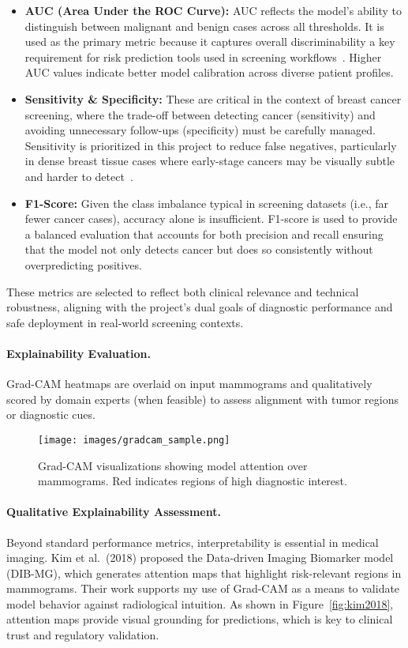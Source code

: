 \documentclass[12pt]{article}
\begin{document}
\begin{itemize}
    \item \textbf{AUC (Area Under the ROC Curve):} AUC reflects the model’s ability to distinguish between malignant and benign cases across all thresholds. It is used as the primary metric because it captures overall discriminability a key requirement for risk prediction tools used in screening workflows~\cite{1}. Higher AUC values indicate better model calibration across diverse patient profiles.

    \item \textbf{Sensitivity \& Specificity:} These are critical in the context of breast cancer screening, where the trade-off between detecting cancer (sensitivity) and avoiding unnecessary follow-ups (specificity) must be carefully managed. Sensitivity is prioritized in this project to reduce false negatives, particularly in dense breast tissue cases where early-stage cancers may be visually subtle and harder to detect~\cite{6}.

    \item \textbf{F1-Score:} Given the class imbalance typical in screening datasets (i.e., far fewer cancer cases), accuracy alone is insufficient. F1-score is used to provide a balanced evaluation that accounts for both precision and recall ensuring that the model not only detects cancer but does so consistently without overpredicting positives.
\end{itemize}

These metrics are selected to reflect both clinical relevance and technical robustness, aligning with the project’s dual goals of diagnostic performance and safe deployment in real-world screening contexts.

\paragraph{Explainability Evaluation.}
Grad-CAM heatmaps are overlaid on input mammograms and qualitatively scored by domain experts (when feasible) to assess alignment with tumor regions or diagnostic cues.

\begin{figure}[H]
    \centering
    \texttt{[image: images/gradcam\_sample.png]}
    \caption{Grad-CAM visualizations showing model attention over mammograms. Red indicates regions of high diagnostic interest.}
\end{figure}

\paragraph{Qualitative Explainability Assessment.}
Beyond standard performance metrics, interpretability is essential in medical imaging. Kim et al.\ (2018) proposed the Data-driven Imaging Biomarker model (DIB-MG), which generates attention maps that highlight risk-relevant regions in mammograms. Their work supports my use of Grad-CAM as a means to validate model behavior against radiological intuition. As shown in Figure~\ref{fig:kim2018}, attention maps provide visual grounding for predictions, which is key to clinical trust and regulatory validation.
\end{document}
